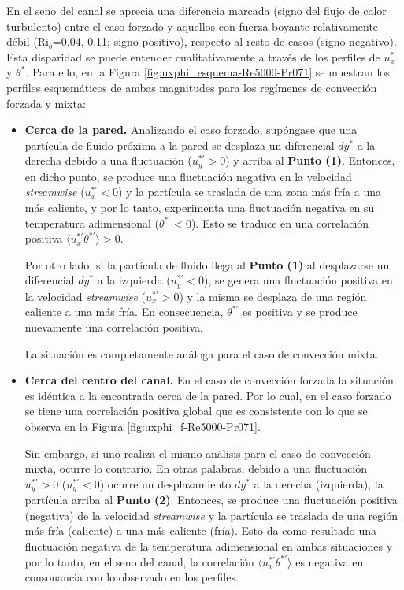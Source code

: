 En el seno del canal se aprecia una diferencia marcada (signo del flujo de calor turbulento) entre el caso forzado y aquellos con fuerza boyante relativamente débil (Ri$_b$=0.04, 0.11; signo positivo), respecto al resto de casos (signo negativo). Esta disparidad se puede entender cualitativamente a través de los perfiles de $u^*_x$ y $\theta^*$. Para ello, en la Figura \ref{fig:uxphi_esquema-Re5000-Pr071} se muestran los perfiles esquemáticos de ambas magnitudes para los regímenes de convección forzada y mixta:

\begin{itemize}

\item \textbf{Cerca de la pared.} Analizando el caso forzado, supóngase que una partícula de fluido próxima a la pared se desplaza un diferencial $dy^*$ a la derecha debido a una fluctuación ($u^{* \prime}_y >0$) y arriba al \textbf{Punto (1)}. Entonces, en dicho punto, se produce una fluctuación negativa en la velocidad \textit{streamwise} ($u^{* \prime}_x <0$) y la partícula se traslada de una zona más fría a una más caliente, y por lo tanto, experimenta una fluctuación negativa en su temperatura adimensional ($\theta^{* \prime}<0$). Esto se traduce en una correlación positiva $\langle u_x^{\ast \prime } \theta^{\ast \prime } \rangle > 0$. 

Por otro lado, si la partícula de fluido llega al \textbf{Punto (1)} al desplazarse un diferencial $dy^*$ a la izquierda ($u^{* \prime}_y <0$), se genera una fluctuación positiva en la velocidad \textit{streamwise}  ($u^{* \prime}_x >0$) y la misma se desplaza de una región caliente a una más fría. En consecuencia, $\theta^{* \prime}$ es positiva y se produce nuevamente una correlación positiva.

La situación es completamente análoga para el caso de convección mixta.

\item \textbf{Cerca del centro del canal.} En el caso de convección forzada la situación es idéntica a la encontrada cerca de la pared. Por lo cual, en el caso forzado se tiene una correlación positiva global que es consistente con lo que se observa en la Figura \ref{fig:uxphi_f-Re5000-Pr071}. 

Sin embargo, si uno realiza el mismo análisis para el caso de convección mixta, ocurre lo contrario. En otras palabras, debido a una fluctuación $u^{* \prime}_y >0$ ($u^{* \prime}_y <0$) ocurre un desplazamiento $dy^*$ a la derecha (izquierda), la partícula arriba al \textbf{Punto (2)}. Entonces, se produce una fluctuación positiva (negativa) de la velocidad \textit{streamwise}  y la partícula se traslada de una región más fría (caliente) a una más caliente (fría). Esto da como resultado una fluctuación negativa de la temperatura adimensional en ambas situaciones y por lo tanto, en el seno del canal, la correlación $\langle u_x^{\ast \prime } \theta^{\ast \prime } \rangle$ es negativa en consonancia con lo observado en los perfiles.
\end{itemize}  
